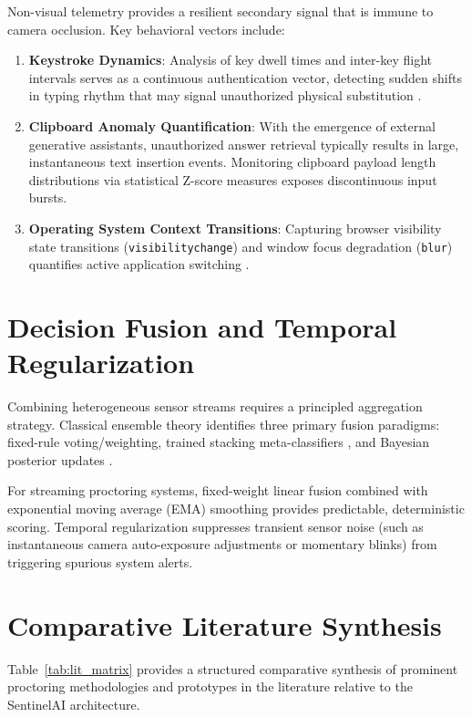 Non-visual telemetry provides a resilient secondary signal that is immune to camera occlusion. Key behavioral vectors include:
\begin{enumerate}
    \item \textbf{Keystroke Dynamics}: Analysis of key dwell times and inter-key flight intervals serves as a continuous authentication vector, detecting sudden shifts in typing rhythm that may signal unauthorized physical substitution \cite{shen2020, teh2013}.
    \item \textbf{Clipboard Anomaly Quantification}: With the emergence of external generative assistants, unauthorized answer retrieval typically results in large, instantaneous text insertion events. Monitoring clipboard payload length distributions via statistical Z-score measures exposes discontinuous input bursts.
    \item \textbf{Operating System Context Transitions}: Capturing browser visibility state transitions (\texttt{visibilitychange}) and window focus degradation (\texttt{blur}) quantifies active application switching \cite{harmon2008}.
\end{enumerate}

\section{Decision Fusion and Temporal Regularization}

Combining heterogeneous sensor streams requires a principled aggregation strategy. Classical ensemble theory identifies three primary fusion paradigms: fixed-rule voting/weighting, trained stacking meta-classifiers \cite{wolpert1992}, and Bayesian posterior updates \cite{tumer1996}.

For streaming proctoring systems, fixed-weight linear fusion combined with exponential moving average (EMA) smoothing provides predictable, deterministic scoring. Temporal regularization suppresses transient sensor noise (such as instantaneous camera auto-exposure adjustments or momentary blinks) from triggering spurious system alerts.

\section{Comparative Literature Synthesis}

Table~\ref{tab:lit_matrix} provides a structured comparative synthesis of prominent proctoring methodologies and prototypes in the literature relative to the SentinelAI architecture.

